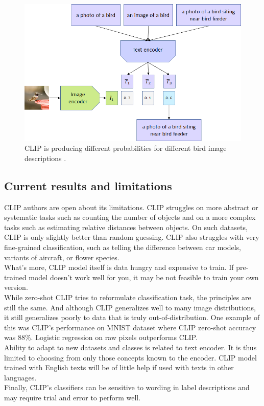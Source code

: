 \documentclass[12pt,a4paper,openany]{book}
\begin{document}
 \begin{figure}[ht!]
     \centering
     \includegraphics[scale=0.5]{figs/clip_model_3.png}
     \caption{CLIP is producing different probabilities for different bird image descriptions \cite{clip_source}.}
 \end{figure}
 \newpage
 \subsection*{Current results and limitations}
 
\noindent CLIP authors are open about its limitations. CLIP struggles on more abstract or systematic tasks such as counting the number of objects and on a more complex tasks such as estimating relative distances between objects. On such datasets, CLIP is only slightly better than random guessing. CLIP also struggles with very fine-grained classification, such as telling the difference between car models, variants of aircraft, or flower species.\\
\noindent What's more,  CLIP model itself is data hungry and expensive to train. If pre-trained model doesn’t work well for you, it may be not feasible to train your own version.\\
\noindent While zero-shot CLIP tries to reformulate classification task, the principles are still the same. And although CLIP generalizes well to many image distributions, it still generalizes poorly to data that is truly out-of-distribution. One example of this was CLIP’s performance on MNIST dataset where CLIP zero-shot accuracy was $88 \%.$ Logistic regression on raw pixels outperforms CLIP.\\
\noindent Ability to adapt to new datasets and classes is related to text encoder. It is thus limited to choosing from only those concepts known to the encoder. CLIP model trained with English texts will be of little help if used with texts in other languages. \\
\noindent Finally, CLIP’s classifiers can be sensitive to wording in label descriptions and may require trial and error to perform well.
\newpage
\end{document}
